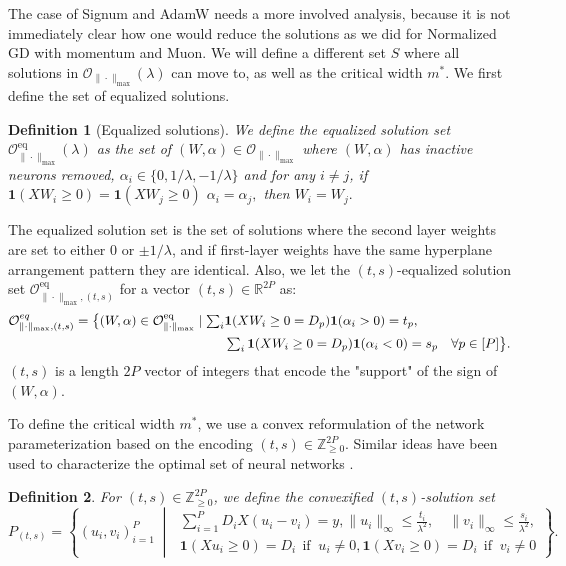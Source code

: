 \documentclass{article}
\newtheorem{definition}{Definition}[section]
\newcommand{\eq}{\mathrm{eq}}      %
\begin{document}
The case of Signum and AdamW needs a more involved analysis, because it is not immediately clear how one would reduce the solutions as we did for Normalized GD with momentum and Muon. We will define a different set $S$ where all solutions in $\mathcal{O}_{\|\cdot\|_{\max}}(\lambda)$ can move to, as well as the critical width $m^*$. We first define the set of equalized solutions.

\begin{definition}[Equalized solutions]
We define the equalized solution set $\mathcal{O}^{\eq}_{\|\cdot\|_{\max}}(\lambda)$ as the set of 
$(W,\alpha) \in \mathcal{O}_{\|\cdot\|_{\max}}$ where $(W,\alpha)$ has inactive neurons removed, $\alpha_i \in \{0, 1/\lambda, -1/\lambda\}$ and for any $i \neq j$, if
    \(
    \mathbf{1}(XW_i \ge 0) = \mathbf{1}(XW_j \ge 0)
    \)
    \(
    \alpha_i = \alpha_j, 
    \)
    then \( W_i=W_j.
    \)
\end{definition}

The equalized solution set is the set of solutions where the second layer weights are set to either $0$ or $\pm 1/\lambda$, and if first-layer weights have the same hyperplane arrangement pattern they are identical. Also, we let the $(t, s)$-equalized solution set $\mathcal{O}_{\|\cdot\|_{\max}, (t, s)}^{\eq}$ for a vector $(t,s) \in \mathbb{R}^{2P}$ as:
\[
\begin{aligned}
\mathcal{O}_{\|\cdot\|_{\max}, (t, s)}^{eq} = \big\{ (W, \alpha) \in \mathcal{O}_{\|\cdot\|_{\max}}^{\eq} \mid \textstyle \sum_i &\mathbf{1}(XW_i \ge 0 = D_p) \mathbf{1}(\alpha_i > 0) = t_p, \\
\textstyle & \textstyle \sum_i \mathbf{1}(XW_i \ge 0 = D_p) \mathbf{1}(\alpha_i < 0) = s_p \quad \forall p \in [P] \big\}.
\end{aligned}
\]
$(t, s)$ is a length $2P$ vector of integers that encode the "support" of the sign of $(W, \alpha)$. 

To define the critical width $m^*$, we use a convex reformulation of the network parameterization based on the encoding $(t,s)\in\mathbb{Z}_{\ge0}^{2P}$. Similar ideas have been used to characterize the optimal set of neural networks \citep{mishkin2023optimal,kim2024exploring}.

\begin{definition}
For $(t,s) \in \mathbb{Z}_{\ge 0}^{2P}$, we define the convexified $(t,s)$-solution set
\[
P_{(t,s)} =
\left\{
(u_i,v_i)_{i=1}^P \;\middle|\;
\begin{array}{l}
\sum_{i=1}^P D_i X (u_i - v_i) = y, \|u_i\|_\infty \le \frac{t_i}{\lambda^2}, \quad
\|v_i\|_\infty \le \frac{s_i}{\lambda^2}, \\[3pt]
\mathbf{1}(Xu_i \ge 0) = D_i \ \  \text{if } \  u_i \ne 0, 
\mathbf{1}(Xv_i \ge 0) = D_i \ \ \text{if } \ v_i \ne 0
\end{array}
\right\}.
\]
\end{definition}
\end{document}
